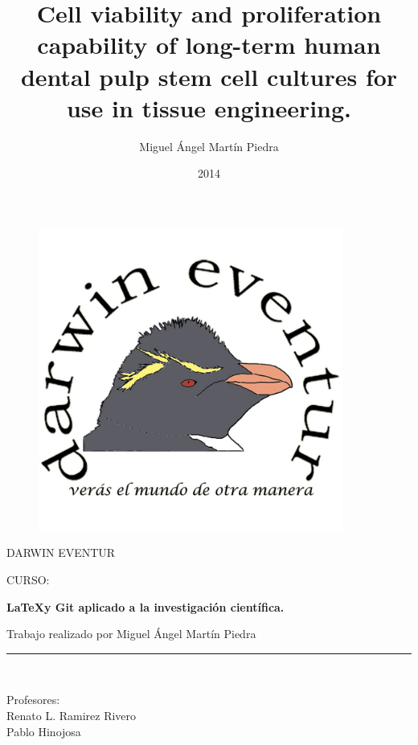 \documentclass[a4paper,12pt]{article}
\author{Miguel Ángel Martín Piedra}
\title{Cell viability and proliferation capability of long-term human dental pulp stem cell cultures for use in tissue engineering.}
\date{2014}
\begin{document}
\sloppy %
\begin{titlepage}

\begin{center}
\vspace*{-1in}
\begin{figure}[htb]
\begin{center}
\includegraphics[width=10cm]{logo}
\end{center}
\end{figure}

DARWIN EVENTUR\\
\vspace*{0.6in}
\begin{large}
CURSO:\\
\end{large}
\vspace*{0.2in}
\begin{Large}
\textbf{\LaTeX y Git aplicado a la investigación científica.} \\
\end{Large}
\vspace*{0.3in}
\begin{large}
Trabajo realizado por Miguel Ángel Martín Piedra\\
\end{large}
\vspace*{0.3in}
\rule{80mm}{0.1mm}\\
\vspace*{0.1in}
\begin{large}
Profesores: \\
Renato L. Ramirez Rivero \\
Pablo Hinojosa \\
\end{large}
\end{center}

\end{titlepage}
\end{document}

